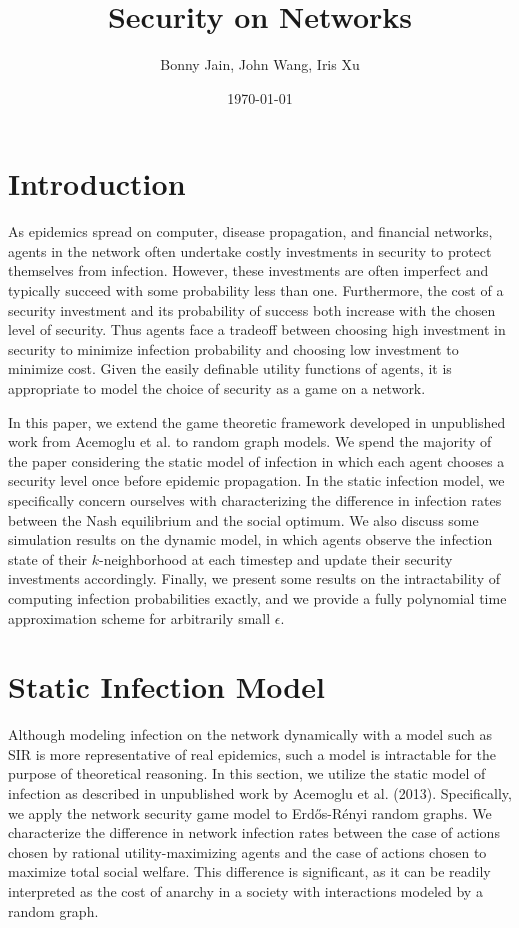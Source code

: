 \documentclass{article}
\title{Security on Networks}
\date{\today}
\author{Bonny Jain, John Wang, Iris Xu}
\theoremstyle{plain}
\begin{document}
  \maketitle

\section{Introduction}

As epidemics spread on computer, disease propagation, and financial networks, agents in the network often undertake costly investments in security to protect themselves from infection. However, these investments are often imperfect and typically succeed with some probability less than one. Furthermore, the cost of a security investment and its probability of success both increase with the chosen level of security. Thus agents face a tradeoff between choosing high investment in security to minimize infection probability and choosing low investment to minimize cost. Given the easily definable utility functions of agents, it is appropriate to model the choice of security as a game on a network.

In this paper, we extend the game theoretic framework developed in unpublished work from Acemoglu et al. to random graph models. We spend the majority of the paper considering the static model of infection in which each agent chooses a security level once before epidemic propagation. In the static infection model, we specifically concern ourselves with characterizing the difference in infection rates between the Nash equilibrium and the social optimum. We also discuss some simulation results on the dynamic model, in which agents observe the infection state of their $k$-neighborhood at each timestep and update their security investments accordingly. Finally, we present some results on the intractability of computing infection probabilities exactly, and we provide a fully polynomial time approximation scheme for arbitrarily small $\epsilon$.

\section{Static Infection Model}

Although modeling infection on the network dynamically with a model such as SIR is more representative of real epidemics, such a model is intractable for the purpose of theoretical reasoning. In this section, we utilize the static model of infection as described in unpublished work by Acemoglu et al. (2013). Specifically, we apply the network security game model to Erd\H{o}s-R\'{e}nyi random graphs. We characterize the difference in network infection rates between the case of actions chosen by rational utility-maximizing agents and the case of actions chosen to maximize total social welfare. This difference is significant, as it can be readily interpreted as the cost of anarchy in a society with interactions modeled by a random graph. 
\end{document}
